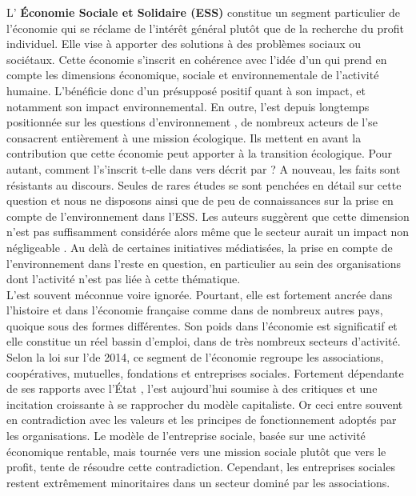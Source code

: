 L’\textbf{ Économie Sociale et Solidaire (ESS) } constitue un segment particulier de l’économie qui se réclame de l'intérêt général plutôt que de la recherche du profit individuel. Elle vise à apporter des solutions à des problèmes sociaux ou sociétaux. Cette économie s’inscrit en cohérence avec l’idée d'un \dd qui prend en compte les dimensions économique, sociale et environnementale de l’activité humaine. L'\ess bénéficie donc d’un présupposé positif quant à son impact, et notamment son impact environnemental. En outre, l'\ess est depuis longtemps positionnée sur les questions d'environnement \parencite{cretieneau2010economie}, de nombreux acteurs de l’\ess se consacrent entièrement à une mission écologique. Ils mettent en avant la contribution que cette économie peut apporter à la transition écologique. Pour autant, comment l'\ess s'inscrit t-elle dans  vers  décrit par \textcite{waridel2016economie} ? A nouveau, les faits sont résistants au discours. Seules de rares études se sont penchées en détail sur cette question et nous ne disposons ainsi que de peu de connaissances sur la prise en compte de l'environnement dans l'ESS. Les auteurs suggèrent que cette dimension n'est pas suffisamment considérée \parencite{edwards2013environmental,buchs2014role} alors même que le secteur aurait un impact non négligeable \parencite{dart2010green}. Au delà de certaines initiatives médiatisées, la prise en compte de l'environnement dans l'\ess reste en question, en particulier au sein des organisations dont l'activité n'est pas liée à cette thématique. \\

L'\ess est souvent méconnue voire ignorée. Pourtant, elle est fortement ancrée dans l'histoire et dans l'économie française comme dans de nombreux autres pays, quoique sous des formes différentes. Son poids dans l'économie est significatif et elle constitue un réel bassin d'emploi, dans de très nombreux secteurs d'activité. Selon la loi sur l'\ess de 2014, ce segment de l'économie regroupe les associations, coopératives, mutuelles, fondations et entreprises sociales. Fortement dépendante de ses rapports avec l'État \parencite{archambault2001historical}, l'\ess est aujourd'hui soumise à des critiques et une incitation croissante à se rapprocher du modèle capitaliste. Or ceci entre souvent en contradiction avec les valeurs et les principes de fonctionnement adoptés par les organisations. Le modèle de l'entreprise sociale, basée sur une activité économique rentable, mais tournée vers une mission sociale plutôt que vers le profit, tente de résoudre cette contradiction. Cependant, les entreprises sociales restent extrêmement minoritaires dans un secteur dominé par les associations. \\

